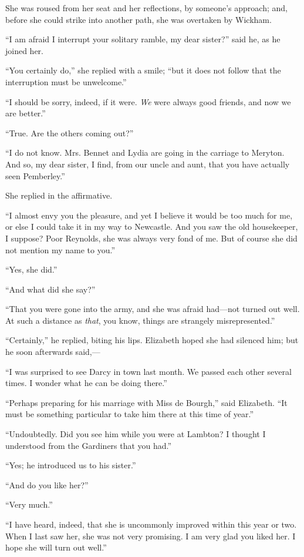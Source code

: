 She was roused from her seat and her reflections, by someone's approach; and, before she could strike into another path, she was overtaken by Wickham.

``I am afraid I interrupt your solitary ramble, my dear sister?'' said he, as he joined her.

``You certainly do,'' she replied with a smile; ``but it does not follow that the interruption must be unwelcome.''

``I should be sorry, indeed, if it were. \textit{We} were always good friends, and now we are better.''

``True. Are the others coming out?''

``I do not know. Mrs. Bennet and Lydia are going in the carriage to Meryton. And so, my dear sister, I find, from our uncle and aunt, that you have actually seen Pemberley.''

She replied in the affirmative.

``I almost envy you the pleasure, and yet I believe it would be too much for me, or else I could take it in my way to Newcastle. And you saw the old housekeeper, I suppose? Poor Reynolds, she was always very fond of me. But of course she did not mention my name to you.''

``Yes, she did.''

``And what did she say?''

``That you were gone into the army, and she was afraid had---not turned out well. At such a distance as \textit{that}, you know, things are strangely misrepresented.''

``Certainly,'' he replied, biting his lips. Elizabeth hoped she had silenced him; but he soon afterwards said,---

``I was surprised to see Darcy in town last month. We passed each other several times. I wonder what he can be doing there.''

``Perhaps preparing for his marriage with Miss de Bourgh,'' said Elizabeth. ``It must be something particular to take him there at this time of year.''

``Undoubtedly. Did you see him while you were at Lambton? I thought I understood from the Gardiners that you had.''

``Yes; he introduced us to his sister.''

``And do you like her?''

``Very much.''

``I have heard, indeed, that she is uncommonly improved within this year or two. When I last saw her, she was not very promising. I am very glad you liked her. I hope she will turn out well.''

